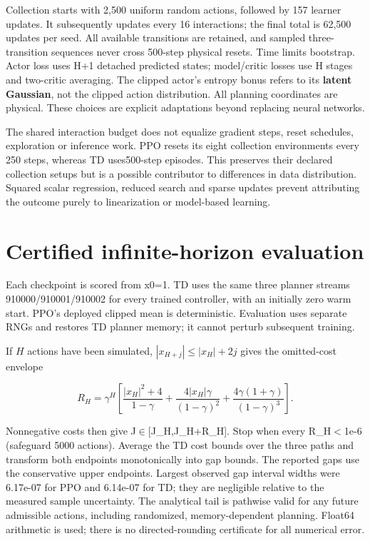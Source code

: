 \documentclass[11pt]{article}
\begin{document}
Collection starts with 2,500 uniform random actions, followed by 157 learner updates. It subsequently updates every 16 interactions; the final total is 62,500 updates per seed. All available transitions are retained, and sampled three-transition sequences never cross 500-step physical resets. Time limits bootstrap. Actor loss uses H+1 detached predicted states; model/critic losses use H stages and two-critic averaging. The clipped actor's entropy bonus refers to its \textbf{latent Gaussian}, not the clipped action distribution. All planning coordinates are physical. These choices are explicit adaptations beyond replacing neural networks.

The shared interaction budget does not equalize gradient steps, reset schedules, exploration or inference work. PPO resets its eight collection environments every 250 steps, whereas TD uses500-step episodes. This preserves their declared collection setups but is a possible contributor to differences in data distribution. Squared scalar regression, reduced search and sparse updates prevent attributing the outcome purely to linearization or model-based learning.

\section{Certified infinite-horizon evaluation}

Each checkpoint is scored from x0=1. TD uses the same three planner streams 910000/910001/910002 for every trained controller, with an initially zero warm start. PPO's deployed clipped mean is deterministic. Evaluation uses separate RNGs and restores TD planner memory; it cannot perturb subsequent training.

If $H$ actions have been simulated, $|x_{H+j}|\leq |x_H|+2j$ gives the omitted-cost envelope

\begin{equation*}
R_H=\gamma^H\left[\frac{|x_H|^2+4}{1-\gamma}
+\frac{4|x_H|\gamma}{(1-\gamma)^2}
+\frac{4\gamma(1+\gamma)}{(1-\gamma)^3}\right].
\end{equation*}

Nonnegative costs then give J$\in$[J\_H,J\_H+R\_H]. Stop when every R\_H$<$1e-6 (safeguard 5000 actions). Average the TD cost bounds over the three paths and transform both endpoints monotonically into gap bounds. The reported gaps use the conservative upper endpoints. Largest observed gap interval widths were 6.17e-07 for PPO and 6.14e-07 for TD; they are negligible relative to the measured sample uncertainty. The analytical tail is pathwise valid for any future admissible actions, including randomized, memory-dependent planning. Float64 arithmetic is used; there is no directed-rounding certificate for all numerical error.
\end{document}
